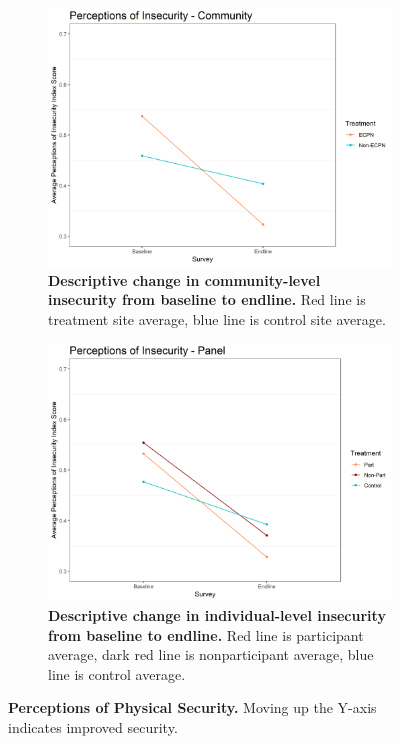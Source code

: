 \documentclass[11pt]{article}
\begin{document}
\begin{figure}[H]
    \begin{subfigure}[b]{.48\textwidth}
    \centering
        \includegraphics[width=\linewidth]{../../../figs/inComm_plot.png}
        \caption{\textbf{Descriptive change in community-level insecurity from baseline to endline.} Red line is treatment site average, blue line is control site average.}
        \label{fig:fig7}
    \end{subfigure}
    \hfill
    \begin{subfigure}[b]{.48\textwidth}
    \centering
        \includegraphics[width=\linewidth]{../../../figs/inPan_plot.png}
        \caption{\textbf{Descriptive change in individual-level insecurity from baseline to endline.} Red line is participant average, dark red line is nonparticipant average, blue line is control average.}
        \label{fig:fig8}
    \end{subfigure}
    \caption{\textbf{Perceptions of Physical Security.}  Moving up the Y-axis indicates improved security.}
\end{figure}
\end{document}
